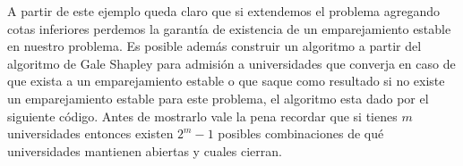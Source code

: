A partir de este ejemplo queda claro que si extendemos el problema agregando cotas inferiores perdemos la garantía de existencia de un emparejamiento estable en nuestro problema. Es posible además construir un algoritmo a partir del algoritmo de Gale Shapley para admisión a universidades que converja en caso de que exista a un emparejamiento estable o que saque como resultado si no existe un emparejamiento estable para este problema, el algoritmo esta dado por el siguiente código. Antes de mostrarlo vale la pena recordar que si tienes $m$ universidades entonces existen $2^{m}-1$ posibles combinaciones de qué universidades mantienen abiertas y cuales cierran. 
\vspace{1 cm}


